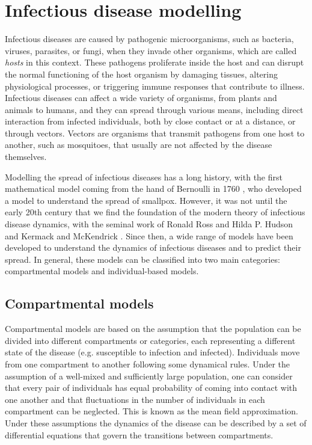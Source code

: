 \section{\label{sec:Infectious disease modelling} Infectious
  disease modelling}

Infectious diseases are caused by pathogenic microorganisms, such as
bacteria, viruses, parasites, or fungi, when they invade other organisms, which
are called \textit{hosts} in this context. These pathogens proliferate inside
the host and can disrupt the normal functioning of the host organism by
damaging tissues, altering physiological processes, or triggering immune
responses that contribute to illness. Infectious diseases can affect a wide
variety of organisms, from plants and animals to humans, and they can spread
through various means, including direct interaction from infected individuals,
both by close contact or at a distance, or through vectors. Vectors are
organisms that transmit pathogens from one host to another, such as mosquitoes,
that usually are not affected by the disease themselves.

Modelling the spread of infectious diseases has a long history, with the first
mathematical model coming from the hand of Bernoulli in 1760
\cite{Bernoulli1760}, who developed a model to understand the spread of
smallpox. However, it was not until the early 20th century that we find the
foundation of the modern theory of infectious disease dynamics, with the
seminal work of Ronald Ross and Hilda P. Hudson
\cite{Ross1916,Ross1917,Ross1917_2} and Kermack and McKendrick
\cite{McKendrick}. Since then, a wide range of models have been
developed to understand the dynamics of infectious diseases and to predict
their spread. In general, these models can be classified into two main
categories: compartmental models and individual-based models.

\subsection{\label{sec:Compartmental models} Compartmental models}

Compartmental models are based on the assumption that the population can be
divided into different compartments or categories, each representing a
different state of the disease (e.g. susceptible to infection and infected).
Individuals move from one compartment to another following some dynamical
rules. Under the assumption of a well-mixed and sufficiently large population,
one can consider that  every pair of individuals has equal probability of
coming into contact with one another and that fluctuations in the number of
individuals in each compartment can be neglected. This is known as the mean
field approximation. Under these assumptions the dynamics of the disease can be
described by a set of differential equations that govern the transitions
between compartments.

